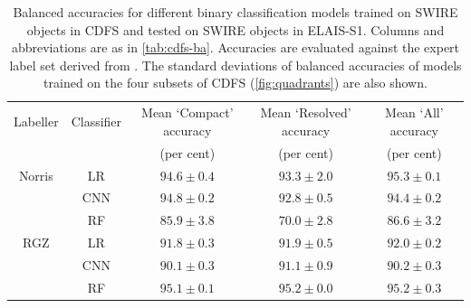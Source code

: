   \begin{table}
    \caption[Balanced accuracies for different binary classification models on ELAIS-S1.]{Balanced accuracies for different binary classification models trained on SWIRE objects
    in CDFS and tested on SWIRE objects in ELAIS-S1. Columns and abbreviations are as in \autoref{tab:cdfs-ba}. Accuracies are evaluated against the expert
    label set derived from \citet{middelberg08}. The standard deviations of balanced accuracies of models trained on the four subsets of
    CDFS (\autoref{fig:quadrants}) are also shown.}
    \label{tab:elais-ba}
    \begin{tabular}{ccccc}
      \hline
      Labeller & Classifier & Mean `Compact' accuracy & Mean `Resolved' accuracy & Mean `All' accuracy\\
        &  & (per cent) & (per cent) & (per cent)\\
      \hline
      Norris & LR & $94.6 \pm 0.4$ & $93.3 \pm 2.0$ & $95.3 \pm 0.1$\\
       & CNN & $94.8 \pm 0.2$ & $92.8 \pm 0.5$ & $94.4 \pm 0.2$\\
       & RF & $85.9 \pm 3.8$ & $70.0 \pm 2.8$ & $86.6 \pm 3.2$\\
      RGZ & LR & $91.8 \pm 0.3$ & $91.9 \pm 0.5$ & $92.0 \pm 0.2$\\
       & CNN & $90.1 \pm 0.3$ & $91.1 \pm 0.9$ & $90.2 \pm 0.3$\\
       & RF & $95.1 \pm 0.1$ & $95.2 \pm 0.0$ & $95.2 \pm 0.3$\\
      \hline
    \end{tabular}
  \end{table}

